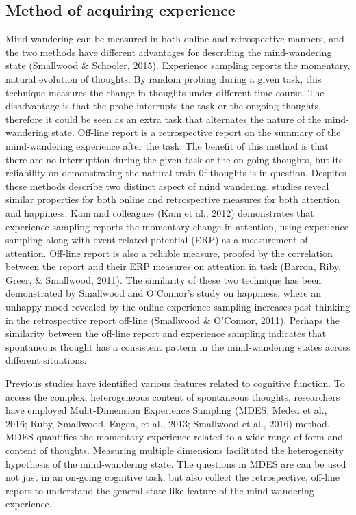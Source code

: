 \subsection{Method of acquiring experience}
Mind-wandering can be measured in both online and retrospective manners, and the two methods have different advantages for describing the mind-wandering state (Smallwood \& Schooler, 2015). Experience sampling reports the momentary, natural evolution of thoughts. By random probing during a given task, this technique measures the change in thoughts under different time course. The disadvantage is that the probe interrupts the task or the ongoing thoughts, therefore it could be seen as an extra task that alternates the nature of the mind-wandering state. Off-line report is a retrospective report on the summary of the mind-wandering experience after the task. The benefit of this method is that there are no interruption during the given task or the on-going thoughts, but its reliability on demonstrating the natural train 0f thoughts is in question.  Despites these methods describe two distinct aspect of mind wandering, studies reveal similar properties for both online and retrospective measures for both attention and happiness. Kam and colleagues (Kam et al., 2012) demonstrates that experience sampling reports the momentary change in attention, using experience sampling along with event-related potential (ERP) as a measurement of attention. Off-line report is also a reliable measure, proofed by the correlation between the report and their ERP measures on attention in task (Barron, Riby, Greer, \& Smallwood, 2011). The similarity of these two technique has been demonstrated by Smallwood and O'Connor’s study on happiness, where an unhappy mood revealed by the online experience sampling increases past thinking in the retrospective report off-line (Smallwood \& O’Connor, 2011). Perhaps the similarity between the off-line report and experience sampling indicates that spontaneous thought has a consistent pattern in the mind-wandering states across different situations. 

Previous studies have identified various features related to cognitive function. To access the complex, heterogeneous content of spontaneous thoughts, researchers have employed Mulit-Dimension Experience Sampling (MDES; Medea et al., 2016; Ruby, Smallwood, Engen, et al., 2013; Smallwood et al., 2016) method. MDES quantifies the momentary experience related to a wide range of form and content of thoughts. Measuring multiple dimensions facilitated the heterogeneity hypothesis of the mind-wandering state. The questions in MDES are can be used not just in an on-going cognitive task, but also collect the retrospective, off-line report to understand the general state-like feature of the mind-wandering experience. 


